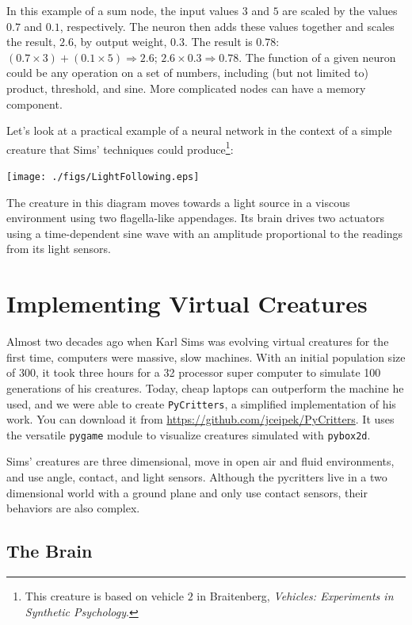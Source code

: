 \documentclass[10pt]{book}
\begin{document}
In this example of a sum node, the input values $3$ and $5$ are scaled by the values $0.7$ and $0.1$, respectively.
The neuron then adds these values together and scales the result, $2.6$, by output weight, $0.3$. The result is $0.78$: 
$(0.7\times 3)+(0.1\times 5) \Rightarrow 2.6$; $2.6 \times 0.3 \Rightarrow 0.78$. 
The function of a given neuron could be any operation on a set of numbers, including 
(but not limited to) product, threshold, and sine. More complicated nodes can 
have a memory component. 

Let's look at a practical example of a neural network in the context of a simple creature that Sims' techniques could produce\footnote{This creature is based on vehicle $2$ in Braitenberg, {\em Vehicles: Experiments in Synthetic Psychology}.}:
\beforefig
\centerline{\texttt{[image: ./figs/LightFollowing.eps]}}
\afterfig

The creature in this diagram moves towards a light source in a viscous environment using two flagella-like appendages. Its brain drives two actuators using a time-dependent sine wave with an amplitude proportional to the readings from its light sensors. %

\section{Implementing Virtual Creatures}
Almost two decades ago when Karl Sims was evolving virtual creatures for the first time, computers were massive, 
slow machines. With an initial population size of 300, it took three hours for a 32 processor super computer to 
simulate 100 generations of his creatures. Today, cheap laptops can outperform the machine he used, and we 
were able to create {\tt PyCritters}, a simplified implementation of his work.
You can download it from \url{https://github.com/jceipek/PyCritters}. It 
uses the versatile {\tt pygame} module to visualize creatures simulated with {\tt pybox2d}.

Sims' creatures are three dimensional, move in open air and fluid environments, and use angle, contact, and light sensors. Although the pycritters 
live in a two dimensional world with a ground plane and only use contact sensors, their behaviors are also complex.

\subsection{The Brain}
\end{document}
